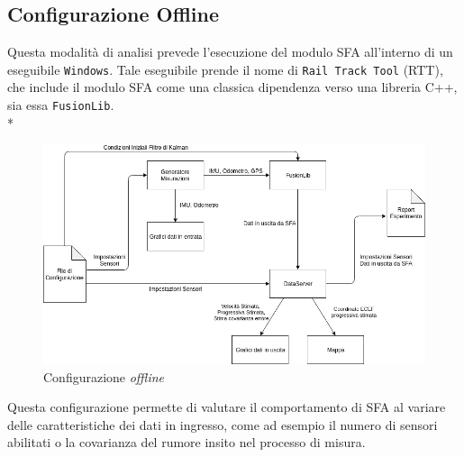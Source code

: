 \subsection{Configurazione Offline}
Questa modalit\`a di analisi prevede l'esecuzione del modulo SFA all'interno di un eseguibile \texttt{Windows}. Tale eseguibile prende il nome di \texttt{Rail Track Tool} (RTT), che include il modulo SFA come una classica dipendenza verso una libreria C++, sia essa \texttt{FusionLib}.\\*
\begin{figure}[h]
	\centering
	\includegraphics[width=0.9\linewidth]{img/rtt}
	\caption{Configurazione \emph{offline}}
	\label{fig:rtt}
\end{figure}\clearpage
Questa configurazione permette di valutare il comportamento di SFA al variare delle caratteristiche dei dati in ingresso, come ad esempio il numero di sensori abilitati o la covarianza del rumore insito nel processo di misura. \cite{measnoise}